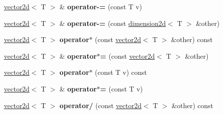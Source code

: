 \begin{DoxyCompactItemize}
\item 
\hyperlink{classirr_1_1core_1_1vector2d}{vector2d}$<$ T $>$ \& {\bfseries operator-\/=} (const T v)\hypertarget{classirr_1_1core_1_1vector2d_a7fbdd3a9627d4f7342c2f897b846c131}{}\label{classirr_1_1core_1_1vector2d_a7fbdd3a9627d4f7342c2f897b846c131}

\item 
\hyperlink{classirr_1_1core_1_1vector2d}{vector2d}$<$ T $>$ \& {\bfseries operator-\/=} (const \hyperlink{classirr_1_1core_1_1dimension2d}{dimension2d}$<$ T $>$ \&other)\hypertarget{classirr_1_1core_1_1vector2d_a9b8112fbfaa7d1a1c07bc3b8fb82e6fa}{}\label{classirr_1_1core_1_1vector2d_a9b8112fbfaa7d1a1c07bc3b8fb82e6fa}

\item 
\hyperlink{classirr_1_1core_1_1vector2d}{vector2d}$<$ T $>$ {\bfseries operator$\ast$} (const \hyperlink{classirr_1_1core_1_1vector2d}{vector2d}$<$ T $>$ \&other) const \hypertarget{classirr_1_1core_1_1vector2d_ad0267af40443b941680e89803710d296}{}\label{classirr_1_1core_1_1vector2d_ad0267af40443b941680e89803710d296}

\item 
\hyperlink{classirr_1_1core_1_1vector2d}{vector2d}$<$ T $>$ \& {\bfseries operator$\ast$=} (const \hyperlink{classirr_1_1core_1_1vector2d}{vector2d}$<$ T $>$ \&other)\hypertarget{classirr_1_1core_1_1vector2d_a2053cd0795a974e9531412967efcc605}{}\label{classirr_1_1core_1_1vector2d_a2053cd0795a974e9531412967efcc605}

\item 
\hyperlink{classirr_1_1core_1_1vector2d}{vector2d}$<$ T $>$ {\bfseries operator$\ast$} (const T v) const \hypertarget{classirr_1_1core_1_1vector2d_afb6e3105c7a869e05042eedcbc31cc84}{}\label{classirr_1_1core_1_1vector2d_afb6e3105c7a869e05042eedcbc31cc84}

\item 
\hyperlink{classirr_1_1core_1_1vector2d}{vector2d}$<$ T $>$ \& {\bfseries operator$\ast$=} (const T v)\hypertarget{classirr_1_1core_1_1vector2d_ac0935984d68c32a2f0cd7e74c53751a7}{}\label{classirr_1_1core_1_1vector2d_ac0935984d68c32a2f0cd7e74c53751a7}

\item 
\hyperlink{classirr_1_1core_1_1vector2d}{vector2d}$<$ T $>$ {\bfseries operator/} (const \hyperlink{classirr_1_1core_1_1vector2d}{vector2d}$<$ T $>$ \&other) const \hypertarget{classirr_1_1core_1_1vector2d_a4eb3724d5c798fbbe326645829eadc11}{}\label{classirr_1_1core_1_1vector2d_a4eb3724d5c798fbbe326645829eadc11}


\end{DoxyCompactItemize}
